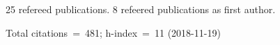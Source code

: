 25 refereed publications. 8 refeered publications as first author.

Total citations~=~481; h-index~=~11 (2018-11-19)
